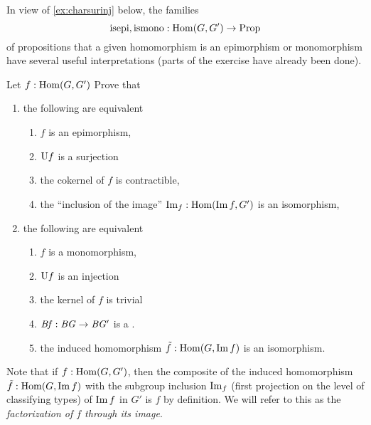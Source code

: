 In view of \cref{ex:charsurinj} below, the families  
$$\mathrm{isepi},\mathrm{ismono}:\Hom(G,G')\to\Prop
$$
of propositions that a given homomorphism is an epimorphism or monomorphism have several useful interpretations (parts of the exercise have already been done).
\begin{xca}
  \label{ex:charsurinj}
  Let $f:\Hom(G,G')$ Prove that
  \begin{enumerate}
  \item the following are equivalent
    \begin{enumerate}
    \item $f$ is an epimorphism,
    \item $\mathrm{U} f$ is a surjection
    \item the cokernel of $f$ is contractible,
    \item the ``inclusion of the image'' $\image_f:\Hom(\image f,G')$ is an isomorphism,
    \end{enumerate}
  \item the following are equivalent
    \begin{enumerate}
    \item $f$ is a monomorphism,
    \item $\mathrm{U} f$ is an injection
\item the kernel of $f$ is trivial
\item $\mathit{B}\mathit{f}:\mathit{B}\mathit{G}\to \mathit{B}\mathit{G}'$ is a \covering.
\item the induced homomorphism $\tilde f:\Hom(G,\image f)$ is an isomorphism.
    \end{enumerate}
  \end{enumerate}
\end{xca}



Note that if $f:\Hom(G,G')$, then the composite of the induced homomorphism $\tilde f:\Hom(G,\image f)$ with the subgroup inclusion $\image_f$ (first projection on the level of classifying types) of $\image f$ in $G'$ is $f$ by definition.  We will refer to this as the \emph{factorization of $f$ through its image}.

